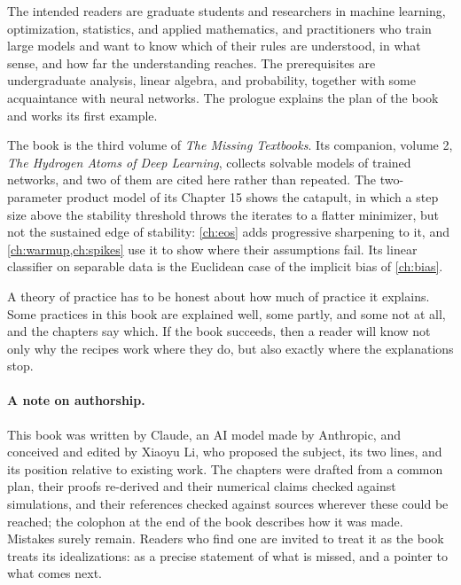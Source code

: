 The intended readers are graduate students and researchers in machine learning, optimization, statistics, and applied mathematics, and practitioners who train large models and want to know which of their rules are understood, in what sense, and how far the understanding reaches. The prerequisites are undergraduate analysis, linear algebra, and probability, together with some acquaintance with neural networks. The prologue explains the plan of the book and works its first example.

The book is the third volume of \emph{The Missing Textbooks}. Its companion, volume 2, \emph{The Hydrogen Atoms of Deep Learning}, collects solvable models of trained networks, and two of them are cited here rather than repeated. The two-parameter product model of its Chapter 15 shows the catapult, in which a step size above the stability threshold throws the iterates to a flatter minimizer, but not the sustained edge of stability: \cref{ch:eos} adds progressive sharpening to it, and \cref{ch:warmup,ch:spikes} use it to show where their assumptions fail. Its linear classifier on separable data is the Euclidean case of the implicit bias of \cref{ch:bias}.

A theory of practice has to be honest about how much of practice it explains. Some practices in this book are explained well, some partly, and some not at all, and the chapters say which. If the book succeeds, then a reader will know not only why the recipes work where they do, but also exactly where the explanations stop.

\paragraph{A note on authorship.} This book was written by Claude, an AI model made by Anthropic, and conceived and edited by Xiaoyu Li, who proposed the subject, its two lines, and its position relative to existing work. The chapters were drafted from a common plan, their proofs re-derived and their numerical claims checked against simulations, and their references checked against sources wherever these could be reached; the colophon at the end of the book describes how it was made. Mistakes surely remain. Readers who find one are invited to treat it as the book treats its idealizations: as a precise statement of what is missed, and a pointer to what comes next.

